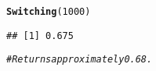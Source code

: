 \documentclass[12pt,letter]{article}\usepackage[]{graphicx}\usepackage[]{color}
\makeatletter
\newcommand{\hlnum}[1]{\textcolor[rgb]{0.686,0.059,0.569}{#1}}%
\newcommand{\hlcom}[1]{\textcolor[rgb]{0.678,0.584,0.686}{\textit{#1}}}%
\newcommand{\hlstd}[1]{\textcolor[rgb]{0.345,0.345,0.345}{#1}}%
\newcommand{\hlkwd}[1]{\textcolor[rgb]{0.737,0.353,0.396}{\textbf{#1}}}%
\newenvironment{kframe}{%
 \def\at@end@of@kframe{}%
 \ifinner\ifhmode%
  \def\at@end@of@kframe{\end{minipage}}%
  \begin{minipage}{\columnwidth}%
 \fi\fi%
 \def\FrameCommand##1{\hskip\@totalleftmargin \hskip-\fboxsep
 \colorbox{shadecolor}{##1}\hskip-\fboxsep
     \hskip-\linewidth \hskip-\@totalleftmargin \hskip\columnwidth}%
 \MakeFramed {\advance\hsize-\width
   \@totalleftmargin\z@ \linewidth\hsize
   \@setminipage}}%
 {\par\unskip\endMakeFramed%
 \at@end@of@kframe}
\newenvironment{knitrout}{}{} %
\makeatother
\begin{document}
\begin{knitrout}
\begin{kframe}
\begin{alltt}
\hlkwd{Switching}\hlstd{(}\hlnum{1000}\hlstd{)}
\end{alltt}
\begin{verbatim}
## [1] 0.675
\end{verbatim}
\begin{alltt}
\hlcom{# Returns approximately 0.68.}
\end{alltt}
\end{kframe}
\end{knitrout}
\end{document}

